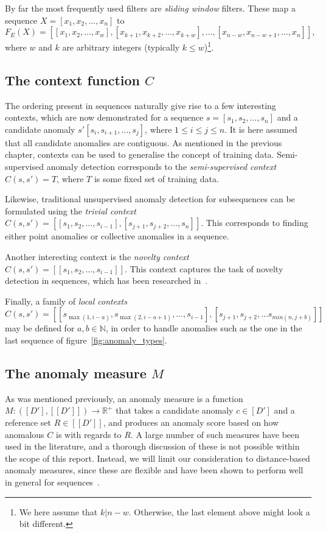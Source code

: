 By far the most frequently used filters are \emph{sliding window} filters. These map a sequence $X = [x_1, x_2, \dots, x_n]$ to
\[
    F_E(X) = [[x_1, x_2, \dots, x_w], [x_{k + 1}, x_{k + 2}, \dots, x_{k + w}], \dots, [x_{n - w}, x_{n - w + 1}, \dots, x_n]],
\]
where $w$ and $k$ are arbitrary integers (typically $k \leq w$)\footnote{We here assume that $k | n - w$. Otherwise, the last element above might look a bit different.}.

\subsection{The context function $C$}

The ordering present in sequences naturally give rise to a few interesting contexts, which are now demonstrated for a sequence $s = [s_1, s_2, \dots, s_n]$ and a candidate anomaly $s' [s_i, s_{i + 1}, \dots, s_j]$, where $1 \leq i \leq j \leq n$. It is here assumed that all candidate anomalies are contiguous. As mentioned in the previous chapter, contexts can be used to generalise the concept of training data. Semi-supervised anomaly detection corresponds to the \emph{semi-supervised context} $C(s, s') = T$, where $T$ is some fixed set of training data.

Likewise, traditional unsupervised anomaly detection for subsequences can be formulated using the \emph{trivial context} $C(s, s') = [[s_1, s_2, \dots, s_{i - 1}], [s_{j + 1}, s_{j + 2}, \dots, s_n]]$. This corresponds to finding either point anomalies or collective anomalies in a sequence.

Another interesting context is the \emph{novelty context} $C(s, s') = [[s_1, s_2, \dots, s_{i - 1}]]$. This context captures the task of novelty detection in sequences, which has been researched in~\cite{TODO}.

Finally, a family of \emph{local contexts}
\[
    C(s, s') = [[s_{\max(1, i - a)}, s_{\max(2, i - a + 1)}, \dots, s_{i-1}], [s_{j+1}, s_{j+2}, \ldots s_{min(n, j+b)}]]
\]
may be defined for $a, b \in \mathbb{N}$, in order to handle anomalies such as the one in the last sequence of figure~\ref{fig:anomaly_types}.

\subsection{The anomaly measure $M$}

As was mentioned previously, an anomaly measure is a function $M: ([D'], [[D']]) \rightarrow \mathbb{R}^+$ that takes a candidate anomaly $c \in [D']$ and a reference set $R \in [[D']]$, and produces an anomaly score based on how anomalous $C$ is with regards to $R$. A large number of such measures have been used in the literature, and a thorough discussion of these is not possible within the scope of this report. Instead, we will limit our consideration to distance-based anomaly measures, since these are flexible and have been shown to perform well in general for sequences~\cite{chandola3}.

